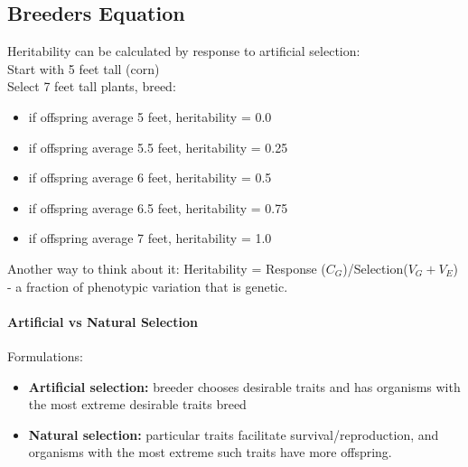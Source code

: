 \documentclass{scrartcl}
\begin{document}
\subsection{Breeders Equation}
\label{sec:5-4}
Heritability can be calculated by response to artificial selection:\\
Start with 5 feet tall (corn)\\
Select 7 feet tall plants, breed:
\begin{itemize}
\item if offspring average 5 feet, heritability = 0.0
\item if offspring average 5.5 feet, heritability = 0.25
\item if offspring average 6 feet, heritability = 0.5
\item if offspring average 6.5 feet, heritability = 0.75
\item if offspring average 7 feet, heritability = 1.0
\end{itemize}
Another way to think about it: Heritability = Response ($C_G$)/Selection($V_G + V_E$) - a fraction of phenotypic variation that is genetic.

\paragraph{Artificial vs Natural Selection}
Formulations:
\begin{itemize}
\item {\bf Artificial selection:} breeder chooses desirable traits and has organisms with the most extreme desirable traits breed
\item {\bf Natural selection:} particular traits facilitate survival/reproduction, and organisms with the most extreme such traits have more offspring.
\end{itemize}

\end{document}
